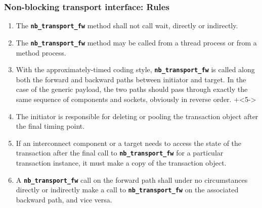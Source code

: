 {\begin{frame}
	\frametitle{Non-blocking transport interface: Rules}
	\begin{enumerate}
		\item The \texttt{\textbf{nb\_transport\_fw}} method shall not call wait, directly or indirectly.
		\item The \texttt{\textbf{nb\_transport\_fw}} method may be called from a thread process or from a method process.
		\item With the approximately-timed coding style, \texttt{\textbf{nb\_transport\_fw}} is called along both the forward and backward paths between initiator and target. 
		In the case of the generic payload, the two paths should pass through exactly the same sequence of components and sockets, obviously in reverse order.
		\vspace{-7cm}
		\onslide+<5->
		\item The initiator is responsible for deleting or pooling the transaction object after the final timing point. 
		\item If an interconnect component or a target needs to access the state of the transaction after the final call to \texttt{\textbf{nb\_transport\_fw}} for a particular transaction instance, it must make a copy of the transaction object.
		\item A \texttt{\textbf{nb\_transport\_fw}} call on the forward path shall under no circumstances directly or indirectly make a call to \texttt{\textbf{nb\_transport\_fw}} on the associated backward path, and vice versa.
	\end{enumerate}
\end{frame}

}
